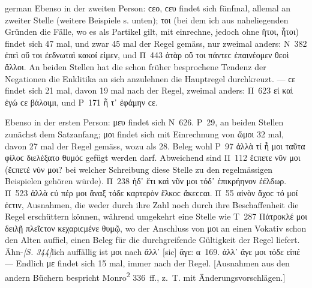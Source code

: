 \begin{otherlanguage*}{german}
Ebenso in der zweiten Person: ϲεο, ϲευ findet sich fünfmal, allemal an zweiter Stelle (weitere Beispiele s. unten); τοι (bei dem ich aus naheliegenden Gründen die Fälle, wo es als Partikel gilt, mit einrechne, jedoch ohne ἤτοι, ἦτοι) findet sich 47 mal, und zwar 45 mal der Regel gemäss, nur zweimal anders: Ν~382 ἐπεὶ οὔ τοι ἐεδνωταὶ κακοί εἰμεν, und Π~443 ἀτὰρ οὔ τοι πάντεϲ ἐπαινέομεν θεοὶ ἄλλοι. An beiden Stellen hat die schon früher besprochene Tendenz der Negationen die Enklitika an sich anzulehnen die Hauptregel durchkreuzt. — ϲε findet sich 21 mal, davon 19 mal nach der Regel, zweimal anders: Π~623 εἰ καὶ ἐγώ ϲε βάλοιμι, und Ρ~171 ἦ τ᾽ ἐφάμην ϲε.

Ebenso in der ersten Person: μευ findet sich Ν~626. Ρ~29, an beiden Stellen zunächst dem Satzanfang; μοι findet sich mit Einrechnung von ὤμοι 32 mal, davon 27 mal der Regel gemäss, wozu als 28. Beleg wohl Ρ~97 ἀλλὰ τί ἦ μοι ταῦτα φίλοϲ διελέξατο θυμόϲ gefügt werden darf. Abweichend sind Π~112 ἕϲπετε νῦν μοι (ἕϲπετέ νύν μοι? bei welcher Schreibung diese Stelle zu den regelmässigen Beispielen gehören würde). Π~238 ἠδ᾽ ἔτι καὶ νῦν μοι τόδ᾽ ἐπικρήηνον ἐέλδωρ. Π~523 ἀλλὰ ϲύ πέρ μοι ἄναξ τόδε καρτερὸν ἕλκοϲ ἄκεϲϲαι. Π~55 αἰνὸν ἄχοϲ τό μοί ἐϲτιν, Ausnahmen, die weder durch ihre Zahl noch durch ihre Beschaffenheit die Regel erschüttern können, während umgekehrt eine Stelle wie Τ~287 Πάτροκλέ μοι δειλῇ πλεῖϲτον κεχαριϲμένε θυμῷ, wo der Anschluss von μοι an einen Vokativ schon den Alten auffiel, einen Beleg für die durchgreifende Gültigkeit der Regel liefert. Ähn-\hypertarget{p344}{\emph{[S. 344]}}\label{p344}lich auffällig ist μοι nach ἄλλ᾽ [sic] ἄγε: α~169. ἀλλ᾽ ἄγε μοι τόδε εἰπέ — Endlich με findet sich 15 mal, immer nach der Regel. [Ausnahmen aus den andern Büchern bespricht Monro\textsuperscript{2} 336~ff., z.~T. mit Änderungsvorschlägen.]


\end{otherlanguage*}
